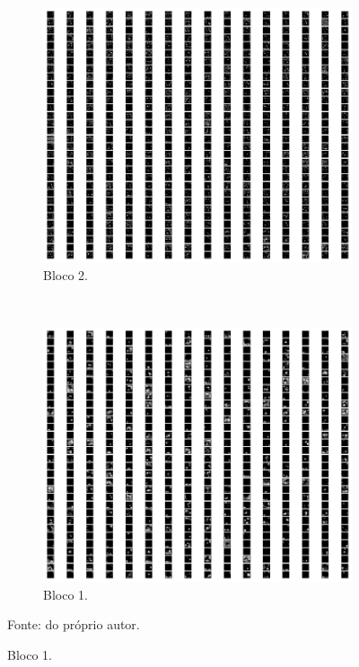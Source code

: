 \begin{figure}[p]
     \begin{subfigure}[t]{0.45\textwidth}
         \centering
         \includegraphics[width=1\linewidth]{recursos/imagens/results/max4.png}
         \caption{Bloco 2.}
         \label{results:fig:datasets:max.4}
     \end{subfigure}%
     ~ 
     \begin{subfigure}[t]{0.45\textwidth}
         \centering
         \includegraphics[width=1\linewidth]{recursos/imagens/results/max5.png}
         \caption{Bloco 1.}
         \label{results:fig:datasets:max.5}
     \end{subfigure}%
 
     Fonte: do próprio autor.
\end{figure}


